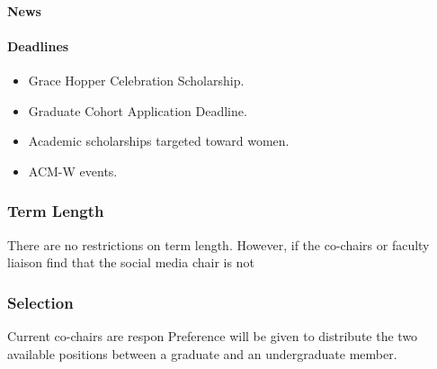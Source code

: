 \paragraph{News} 

\paragraph{Deadlines}
\begin{itemize}
	\item Grace Hopper Celebration Scholarship.
	\item Graduate Cohort Application Deadline.
	\item Academic scholarships targeted toward women.
	\item ACM-W events.
\end{itemize}


\subsubsection{Term Length}
\label{sec:socialmedia_termlength}
There are no restrictions on term length. However, if the co-chairs or faculty liaison find that the social media chair is not 

\subsubsection{Selection}
\label{sec:socialmedia_selection}
Current co-chairs are respon
Preference will be given to distribute the two available positions between a graduate and an undergraduate member.